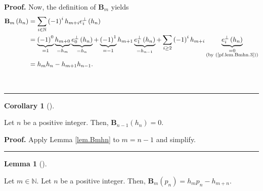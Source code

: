 \documentclass[numbers=enddot,12pt,final,onecolumn,notitlepage]{scrartcl}%
\theoremstyle{definition}
\newtheorem{lem}[theo]{Lemma}
\newenvironment{lemma}[1][]
{\begin{lem}[#1]\begin{leftbar}}
{\end{leftbar}\end{lem}}
\newtheorem{coro}[theo]{Corollary}
\newenvironment{corollary}[1][]
{\begin{coro}[#1]\begin{leftbar}}
{\end{leftbar}\end{coro}}
\newenvironment{proof}[1][Proof]{\noindent\textbf{#1.} }{\ \rule{0.5em}{0.5em}}
\let\sumnonlimits\sum
\renewcommand{\sum}{\sumnonlimits\limits}
\begin{document}
\begin{proof}
Now, the definition of $\mathbf{B}_{m}$ yields%
\begin{align*}
\mathbf{B}_{m}\left(  h_{n}\right)   &  =\sum_{i\in\mathbb{N}}\left(
-1\right)  ^{i}h_{m+i}e_{i}^{\perp}\left(  h_{n}\right) \\
&  =\underbrace{\left(  -1\right)  ^{0}}_{=1}\underbrace{h_{m+0}}_{=h_{m}%
}\underbrace{e_{0}^{\perp}\left(  h_{n}\right)  }_{=h_{n}}+\underbrace{\left(
-1\right)  ^{1}}_{=-1}h_{m+1}\underbrace{e_{1}^{\perp}\left(  h_{n}\right)
}_{=h_{n-1}}+\sum_{i\geq2}\left(  -1\right)  ^{i}h_{m+i}\underbrace{e_{i}%
^{\perp}\left(  h_{n}\right)  }_{\substack{=0\\\text{(by (\ref{pf.lem.Bmhn.3}%
))}}}\\
&  =h_{m}h_{n}-h_{m+1}h_{n-1}.
\end{align*}

\end{proof}

\begin{corollary}
\label{cor.Bn-1Hn}Let $n$ be a positive integer. Then, $\mathbf{B}%
_{n-1}\left(  h_{n}\right)  =0$.
\end{corollary}

\begin{proof}
Apply Lemma \ref{lem.Bmhn} to $m=n-1$ and simplify.
\end{proof}

\begin{lemma}
\label{lem.Bmpn}Let $m\in\mathbb{N}$. Let $n$ be a positive integer. Then,
$\mathbf{B}_{m}\left(  p_{n}\right)  =h_{m}p_{n}-h_{m+n}$.
\end{lemma}
\end{document}
